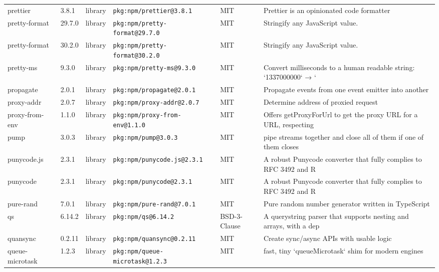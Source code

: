 \documentclass[11pt,a4paper]{article}
\begin{document}
\begin{longtable}{|p{4cm}|p{2cm}|p{1.6cm}|p{5cm}|p{1.5cm}|p{3.5cm}|}
\raggedright prettier & 3.8.1 & library & \small\texttt{pkg:npm/prettier@3.8.1} & MIT & \small Prettier is an opinionated code formatter \\
\raggedright pretty-format & 29.7.0 & library & \small\texttt{pkg:npm/pretty-format@29.7.0} & MIT & \small Stringify any JavaScript value. \\
\raggedright pretty-format & 30.2.0 & library & \small\texttt{pkg:npm/pretty-format@30.2.0} & MIT & \small Stringify any JavaScript value. \\
\raggedright pretty-ms & 9.3.0 & library & \small\texttt{pkg:npm/pretty-ms@9.3.0} & MIT & \small Convert milliseconds to a human readable string: `1337000000` → ` \\
\raggedright propagate & 2.0.1 & library & \small\texttt{pkg:npm/propagate@2.0.1} & MIT & \small Propagate events from one event emitter into another \\
\raggedright proxy-addr & 2.0.7 & library & \small\texttt{pkg:npm/proxy-addr@2.0.7} & MIT & \small Determine address of proxied request \\
\raggedright proxy-from-env & 1.1.0 & library & \small\texttt{pkg:npm/proxy-from-env@1.1.0} & MIT & \small Offers getProxyForUrl to get the proxy URL for a URL, respecting  \\
\raggedright pump & 3.0.3 & library & \small\texttt{pkg:npm/pump@3.0.3} & MIT & \small pipe streams together and close all of them if one of them closes \\
\raggedright punycode.js & 2.3.1 & library & \small\texttt{pkg:npm/punycode.js@2.3.1} & MIT & \small A robust Punycode converter that fully complies to RFC 3492 and R \\
\raggedright punycode & 2.3.1 & library & \small\texttt{pkg:npm/punycode@2.3.1} & MIT & \small A robust Punycode converter that fully complies to RFC 3492 and R \\
\raggedright pure-rand & 7.0.1 & library & \small\texttt{pkg:npm/pure-rand@7.0.1} & MIT & \small  Pure random number generator written in TypeScript \\
\raggedright qs & 6.14.2 & library & \small\texttt{pkg:npm/qs@6.14.2} & BSD-3-Clause & \small A querystring parser that supports nesting and arrays, with a dep \\
\raggedright quansync & 0.2.11 & library & \small\texttt{pkg:npm/quansync@0.2.11} & MIT & \small Create sync/async APIs with usable logic \\
\raggedright queue-microtask & 1.2.3 & library & \small\texttt{pkg:npm/queue-microtask@1.2.3} & MIT & \small fast, tiny `queueMicrotask` shim for modern engines \\

\end{longtable}
\end{document}
